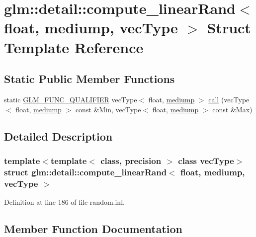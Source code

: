 \hypertarget{structglm_1_1detail_1_1compute__linear_rand_3_01float_00_01mediump_00_01vec_type_01_4}{}\section{glm\+::detail\+::compute\+\_\+linear\+Rand$<$ float, mediump, vec\+Type $>$ Struct Template Reference}
\label{structglm_1_1detail_1_1compute__linear_rand_3_01float_00_01mediump_00_01vec_type_01_4}
\subsection*{Static Public Member Functions}
\begin{DoxyCompactItemize}
\item 
static \mbox{\hyperlink{setup_8hpp_a33fdea6f91c5f834105f7415e2a64407}{G\+L\+M\+\_\+\+F\+U\+N\+C\+\_\+\+Q\+U\+A\+L\+I\+F\+I\+ER}} vec\+Type$<$ float, \mbox{\hyperlink{namespaceglm_a0f04f086094c747d227af4425893f545a6416f3ea0c9025fb21ed50c4d6620482}{mediump}} $>$ \mbox{\hyperlink{structglm_1_1detail_1_1compute__linear_rand_3_01float_00_01mediump_00_01vec_type_01_4_a9202e17262bd8b1ffb9804bf681e1d49}{call}} (vec\+Type$<$ float, \mbox{\hyperlink{namespaceglm_a0f04f086094c747d227af4425893f545a6416f3ea0c9025fb21ed50c4d6620482}{mediump}} $>$ const \&Min, vec\+Type$<$ float, \mbox{\hyperlink{namespaceglm_a0f04f086094c747d227af4425893f545a6416f3ea0c9025fb21ed50c4d6620482}{mediump}} $>$ const \&Max)
\end{DoxyCompactItemize}


\subsection{Detailed Description}
\subsubsection*{template$<$template$<$ class, precision $>$ class vec\+Type$>$\newline
struct glm\+::detail\+::compute\+\_\+linear\+Rand$<$ float, mediump, vec\+Type $>$}



Definition at line 186 of file random.\+inl.



\subsection{Member Function Documentation}
\mbox{\label{structglm_1_1detail_1_1compute__linear_rand_3_01float_00_01mediump_00_01vec_type_01_4_a9202e17262bd8b1ffb9804bf681e1d49}} 
